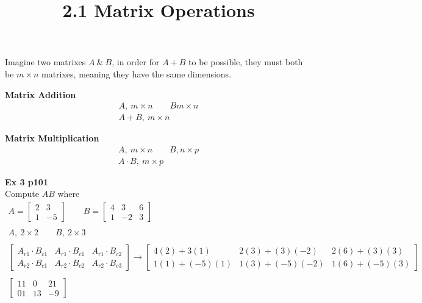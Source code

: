 \documentclass{article}
\title{2.1 Matrix Operations}
\begin{document}
  \maketitle
  Imagine two matrixes $ A ~\&~B $, in order for $ A+B $ to be possible, they must both be $ m \times n $ matrixes, meaning they have the same dimensions.

  \textbf{Matrix Addition}
  \[
    \begin{gathered}
    A,~m \times n \qquad B m \times n\\
    A+B,~m \times n
    \end{gathered}
  \]

  \textbf{Matrix Multiplication}
  \[
    \begin{gathered}
    A,~m \times n \qquad B, n \times p\\
    A \cdot B,~m \times p
    \end{gathered}
  \]

  \textbf{Ex 3 p101}\\
  Compute $ AB $ where \[
    \begin{gathered}
    A = \begin{bmatrix}
      2 &3\\
      1 &-5
    \end{bmatrix} \qquad
    B = \begin{bmatrix}
      4 &3 &6\\
      1 &-2 &3
    \end{bmatrix}\\
    ~\\
    A,~2\times2 \qquad B,~2 \times 3\\
    ~\\
    \begin{bmatrix}
      A_{r1} \cdot B_{c1} &A_{r1} \cdot B_{c1} &A_{r1} \cdot B_{c2}\\
      A_{r2} \cdot B_{c1} &A_{r2} \cdot B_{c2} &A_{r2} \cdot B_{c3}    
    \end{bmatrix} \to
    \begin{bmatrix}
      4(2) +3(1) &2(3) + (3)(-2) &2(6) + (3)(3)\\
      1(1) + (-5)(1) &1(3) + (-5)(-2) &1(6) + (-5)(3)
    \end{bmatrix}\\
    ~\\
    \begin{bmatrix}
      11 &0 &21\\
      01 &13 &-9
    \end{bmatrix}
    \end{gathered}
  \]
\end{document}
